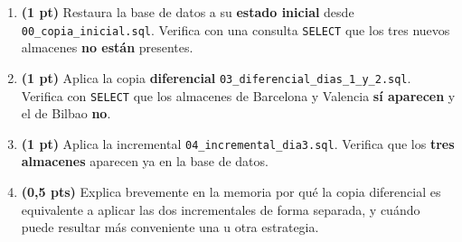 \documentclass[a4paper,11pt]{article}
\begin{document}
\begin{Form}
\begin{enumerate}
    \item \textbf{(1 pt)} Restaura la base de datos a su \textbf{estado inicial} desde \texttt{00\_copia\_inicial.sql}. Verifica con una consulta \texttt{SELECT} que los tres nuevos almacenes \textbf{no están} presentes.
    \item \textbf{(1 pt)} Aplica la copia \textbf{diferencial} \texttt{03\_diferencial\_dias\_1\_y\_2.sql}. Verifica con \texttt{SELECT} que los almacenes de Barcelona y Valencia \textbf{sí aparecen} y el de Bilbao \textbf{no}.
    \item \textbf{(1 pt)} Aplica la incremental \texttt{04\_incremental\_dia3.sql}. Verifica que los \textbf{tres almacenes} aparecen ya en la base de datos.
    \item \textbf{(0,5 pts)} Explica brevemente en la memoria por qué la copia diferencial es equivalente a aplicar las dos incrementales de forma separada, y cuándo puede resultar más conveniente una u otra estrategia.
\end{enumerate}

\end{Form}
\end{document}
